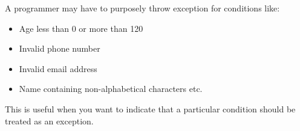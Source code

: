 \setlength{\columnsep}{3pt}
\begin{flushleft}
	
	A programmer may have to purposely throw exception for conditions like:
	\begin{itemize}
		\item Age less than 0 or more than 120
		\item Invalid phone number 
		\item Invalid email address
		\item Name containing non-alphabetical characters etc.
	\end{itemize}
	This is useful when you want to indicate that a particular condition should be treated as an exception.
			
\end{flushleft}






